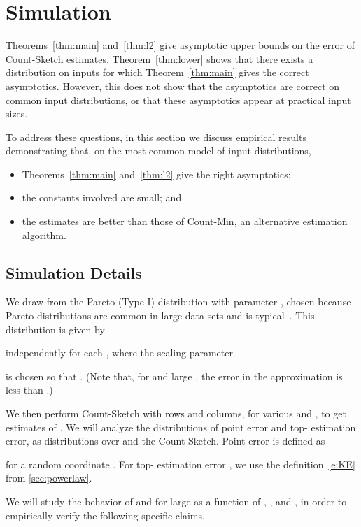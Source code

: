 \documentclass[letterpaper,11pt]{article}
\begin{document}
\section{Simulation}\label{sec:simul}

Theorems~\ref{thm:main} and~\ref{thm:l2} give asymptotic upper bounds
on the error of Count-Sketch estimates.  Theorem~\ref{thm:lower}
shows that there exists a distribution on inputs for which
Theorem~\ref{thm:main} gives the correct asymptotics.  However, this
does not show that the asymptotics are correct on common input
distributions, or that these asymptotics appear at practical input
sizes.

To address these questions, in this section we discuss empirical results demonstrating
that, on the most common model of input distributions,
\begin{itemize}
\item Theorems~\ref{thm:main} and~\ref{thm:l2} give the right asymptotics;
\item the constants involved are small; and
\item the estimates are better than those of Count-Min, an alternative
  estimation algorithm.
\end{itemize}

\subsection{Simulation Details}
We draw  from the Pareto (Type I) distribution with
parameter , chosen because Pareto distributions are common in large data sets and  is typical~\cite{CSN,M04}.
This distribution is given by

independently for each , where the scaling parameter

is chosen so that .  (Note that, for  and large , the
error in the approximation  is less than .)

We then perform Count-Sketch with  rows and  columns, for
various  and , to get estimates  of .  We will
analyze the distributions of point error and top- estimation error,
as distributions over  and the Count-Sketch.  Point error is
defined as

for a random coordinate .  For top- estimation error , we use the
definition~\eqref{e:KE} from \textsection\ref{sec:powerlaw}.

We will study the behavior of  and  for large  as a
function of , , and , in order to empirically verify the
following specific claims.
\end{document}
